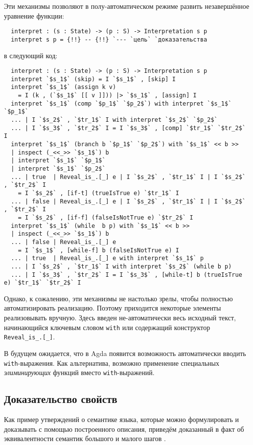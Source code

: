 \documentclass[aps,12pt,final,oneside,onecolumn,musixtex,superscriptaddress,centertags]{article}
\newcommand{\lcode}[1]{\lstinline[basicstyle=\ttfamily\normalsize]{#1}}
\begin{document}
  Эти механизмы позволяют в полу-автоматическом режиме развить незавершённое уравнение функции:
  \begin{lstlisting}
  interpret : (s : State) -> (p : S) -> Interpretation s p
  interpret s p = {!!} -- {!!} `--- `цель` `доказательства
  \end{lstlisting}
  в следующий код:
  \begin{lstlisting}
  interpret : (s : State) -> (p : S) -> Interpretation s p
  interpret `$s_1$` (skip) = I `$s_1$` , [skip] I
  interpret `$s_1$` (assign k v)
    = I (k , (`$s_1$` [[ v ]])) |> `$s_1$` , [assign] I
  interpret `$s_1$` (comp `$p_1$` `$p_2$`) with interpret `$s_1$` `$p_1$`
  ... | I `$s_2$` , `$tr_1$` I with interpret `$s_2$` `$p_2$`
  ... | I `$s_3$` , `$tr_2$` I = I `$s_3$` , [comp] `$tr_1$` `$tr_2$` I
  interpret `$s_1$` (branch b `$p_1$` `$p_2$`) with `$s_1$` << b >>
  | inspect (_<<_>> `$s_1$`) b
  | interpret `$s_1$` `$p_1$`
  | interpret `$s_1$` `$p_2$`
  ... | true  | Reveal_is_.[_] e | I `$s_2$` , `$tr_1$` I | I `$s_2$` , `$tr_2$` I
    = I `$s_2$` , [if-t] (trueIsTrue e) `$tr_1$` I
  ... | false | Reveal_is_.[_] e | I `$s_2$` , `$tr_1$` I | I `$s_2$` , `$tr_2$` I
    = I `$s_2$` , [if-f] (falseIsNotTrue e) `$tr_2$` I
  interpret `$s_1$` (while  b p) with `$s_1$` << b >>
  | inspect (_<<_>> `$s_1$`) b
  ... | false | Reveal_is_.[_] e
    = I `$s_1$` , [while-f] b (falseIsNotTrue e) I
  ... | true  | Reveal_is_.[_] e with interpret `$s_1$` p
  ... | I `$s_2$` , `$tr_1$` I with interpret `$s_2$` (while b p)
  ... | I `$s_3$` , `$tr_2$` I = I `$s_3$` , [while-t] b (trueIsTrue e) `$tr_1$` `$tr_2$` I
  \end{lstlisting}
  Однако, к сожалению, эти механизмы не настолько зрелы, чтобы полностью автоматизировать реализацию. Поэтому приходится некоторые элементы реализовывать вручную. Здесь введен не-автоматически весь исходный текст, начинающийся ключевым словом \lcode{with} или содержащий конструктор \lcode{Reveal_is_.[_]}.

  В будущем ожидается, что в Agda появится возможность автоматически вводить \lcode{with}-выражения. Как альтернатива, возможно применение специальных \emph{элиминирующих} функций вместо \lcode{with}-выражений.

  \subsection{Доказательство свойств}

  Как пример утверждений о семантике языка, которые можно формулировать и доказывать с помощью построенного описания, приведём доказанный в \cite{Nielson:1992:SAF:129085} факт об эквивалентности семантик большого и малого шагов \While.
\end{document}
